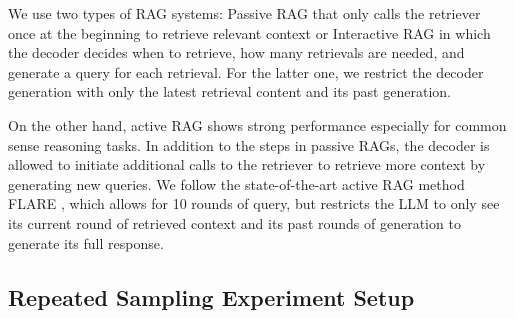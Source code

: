 We use two types of RAG systems: Passive RAG that only calls the retriever once at the beginning to retrieve relevant context or Interactive RAG \cite{jiang2023activeretrievalaugmentedgeneration} in which the decoder decides when to retrieve, how many retrievals are needed, and generate a query for each retrieval. For the latter one, we restrict the decoder generation with only the latest retrieval content and its past generation. 

On the other hand, active RAG shows strong performance \cite{jiang2023activeretrievalaugmentedgeneration} especially for common sense reasoning tasks. In addition to the steps in passive RAGs, the decoder is allowed to initiate additional calls to the retriever to retrieve more context by generating new queries. We follow the state-of-the-art active RAG method FLARE \cite{jiang2023activeretrievalaugmentedgeneration}, which allows for 10 rounds of query, but restricts the LLM to only see its current round of retrieved context and its past rounds of generation to generate its full response. 


\subsection{Repeated Sampling Experiment Setup}

